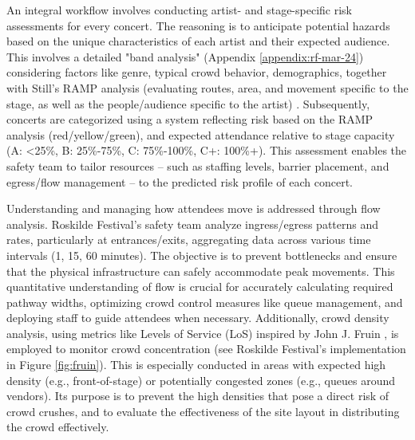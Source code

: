 An integral workflow involves conducting artist- and stage-specific risk assessments for every concert. The reasoning is to anticipate potential hazards based on the unique characteristics of each artist and their expected audience. This involves a detailed "band analysis" (Appendix \ref{appendix:rf-mar-24}) considering factors like genre, typical crowd behavior, demographics, together with Still's RAMP analysis (evaluating routes, area, and movement specific to the stage, as well as the people/audience specific to the artist) \cite{ramp}. Subsequently, concerts are categorized using a system reflecting risk based on the RAMP analysis (red/yellow/green), and expected attendance relative to stage capacity (A: <25\%, B: 25\%-75\%, C: 75\%-100\%, C+: 100\%+). This assessment enables the safety team to tailor resources -- such as staffing levels, barrier placement, and egress/flow management -- to the predicted risk profile of each concert.

Understanding and managing how attendees move is addressed through flow analysis. Roskilde Festival's safety team analyze ingress/egress patterns and rates, particularly at entrances/exits, aggregating data across various time intervals (1, 15, 60 minutes). The objective is to prevent bottlenecks and ensure that the physical infrastructure can safely accommodate peak movements. This quantitative understanding of flow is crucial for accurately calculating required pathway widths, optimizing crowd control measures like queue management, and deploying staff to guide attendees when necessary. Additionally, crowd density analysis, using metrics like Levels of Service (LoS) inspired by John J. Fruin \cite{fruin}, is employed to monitor crowd concentration (see Roskilde Festival's implementation in Figure \ref{fig:fruin}). This is especially conducted in areas with expected high density (e.g., front-of-stage) or potentially congested zones (e.g., queues around vendors). Its purpose is to prevent the high densities that pose a direct risk of crowd crushes, and to evaluate the effectiveness of the site layout in distributing the crowd effectively.

